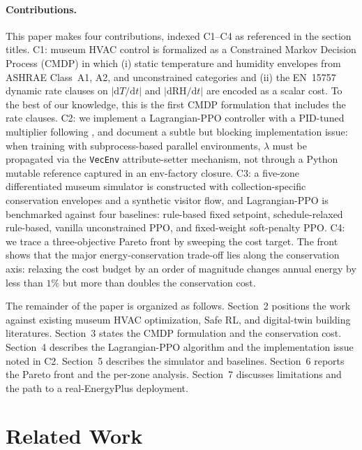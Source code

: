 \documentclass[11pt,a4paper]{article}
\begin{document}
\paragraph{Contributions.}
This paper makes four contributions, indexed C1--C4 as referenced in the
section titles. C1: museum HVAC control is formalized as a Constrained
Markov Decision Process (CMDP) in which (i) static temperature and
humidity envelopes from ASHRAE Class~A1, A2, and unconstrained categories
and (ii) the EN~15757 dynamic rate clauses on
$|\mathrm{d}T/\mathrm{d}t|$ and $|\mathrm{d}\mathrm{RH}/\mathrm{d}t|$
are encoded as a scalar cost. To the best of our knowledge, this is the
first CMDP formulation that includes the rate clauses. C2: we implement
a Lagrangian-PPO controller with a PID-tuned multiplier following
\citet{stooke2020responsive}, and document a subtle but blocking
implementation issue: when training with subprocess-based parallel
environments, $\lambda$ must be propagated via the \texttt{VecEnv}
attribute-setter mechanism, not through a Python mutable reference
captured in an env-factory closure. C3: a five-zone differentiated museum
simulator is constructed with collection-specific conservation envelopes
and a synthetic visitor flow, and Lagrangian-PPO is benchmarked against
four baselines: rule-based fixed setpoint, schedule-relaxed rule-based,
vanilla unconstrained PPO, and fixed-weight soft-penalty PPO. C4: we
trace a three-objective Pareto front by sweeping the cost target. The
front shows that the major energy-conservation trade-off lies along the
conservation axis: relaxing the cost budget by an order of magnitude
changes annual energy by less than $1\%$ but more than doubles the
conservation cost.

The remainder of the paper is organized as follows.
Section~2 positions the work against existing museum
HVAC optimization, Safe RL, and digital-twin building literatures.
Section~3 states the CMDP formulation and the
conservation cost. Section~4 describes the Lagrangian-PPO
algorithm and the implementation issue noted in C2.
Section~5 describes the simulator and baselines.
Section~6 reports the Pareto front and the per-zone
analysis. Section~7 discusses limitations and the
path to a real-EnergyPlus deployment.

\section{Related Work}\label{sec:related}
\end{document}
